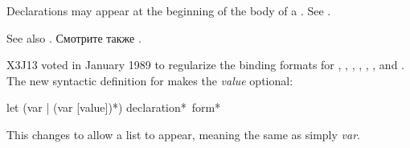 \begin{defspec}
Declarations may appear at the beginning of the body of a .
See .

\begin{newer}
See also .
Смотрите также .
\end{newer}

\begin{new}
X3J13 voted in January 1989
to regularize the binding formats for , , ,
, , , and .
The new syntactic definition for  makes the \emph{value} optional:

\begin{defmac}
let ({var | (var [value])}*) {declaration}* {\,form}*

This changes  to allow a list  to appear,
meaning the same as simply \emph{var}.
\end{defmac}
\end{new}
\end{defspec}

